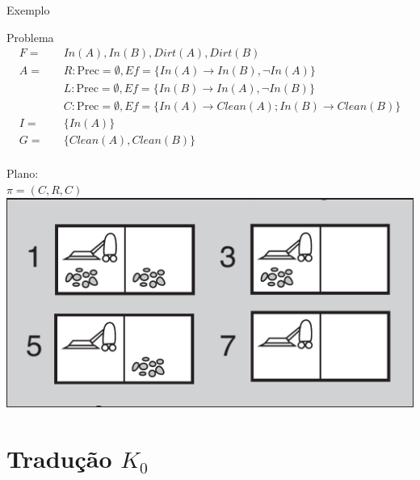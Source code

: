 \begin{frame}{Exemplo}
     \begin{block}{Problema}
        \begin{align*}
            F = \quad  & In(A),In(B),Dirt(A),Dirt(B) \\
            A = \quad  & R: \text{Prec} = \emptyset, Ef= \{ In(A) \rightarrow In(B),\lnot In(A) \} \\
                       & L: \text{Prec} = \emptyset, Ef= \{ In(B) \rightarrow In(A),\lnot In(B) \} \\
                       & C: \text{Prec} = \emptyset, Ef= \{ In(A)  \rightarrow Clean(A); In(B) \rightarrow Clean(B) \} \\
            I = \quad  & \{ In(A)\} \\
            G = \quad  & \{ Clean(A),Clean(B)  \} \\
        \end{align*}
    \end{block}
    
        \begin{multicols}{2}
            \centering
             Plano: \\$\pi = (C,R,C)$\\
        \columnbreak
            \includegraphics[scale=0.13 ]{images/belief_state0.png}
        
        \end{multicols}
    
\end{frame}





\section{Tradução $K_0$}


